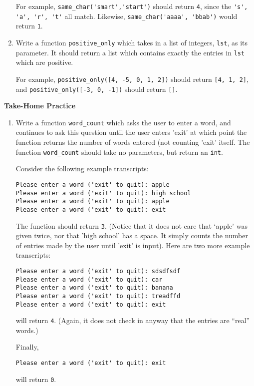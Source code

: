 \documentclass{article}
\begin{document}
\begin{enumerate}
    For example, \verb|same_char('smart','start')| should return \verb|4|, since the \verb|'s', 'a', 'r', 't'| all match. Likewise, \verb|same_char('aaaa', 'bbab')| would return \verb|1|.

\item Write a function \verb|positive_only| which takes in a list of integers, \verb|lst|, as its parameter. It should return a list which contains exactly the entries in \verb|lst| which are positive.

    For example, \verb|positive_only([4, -5, 0, 1, 2])| should return \verb|[4, 1, 2]|, and \verb|positive_only([-3, 0, -1])| should return \verb|[]|.
\end{enumerate}
\newpage
\textbf{Take-Home Practice}

\begin{enumerate}

\item  Write a function \verb|word_count| which asks the user to enter a word, and continues to ask this question until the user enters 'exit' at which point the function returns the number of words entered (not counting 'exit' itself. The function \verb|word_count| should take no parameters, but return an \verb|int|.

    Consider the following example transcripts:

\begin{verbatim}
Please enter a word ('exit' to quit): apple
Please enter a word ('exit' to quit): high school
Please enter a word ('exit' to quit): apple
Please enter a word ('exit' to quit): exit
\end{verbatim}
The function should return \verb|3|. (Notice that it does not care that `apple' was given twice, nor that 'high school' has a space. It simply counts the number of entries made by the user until 'exit' is input).  Here are two more example transcripts:

\begin{verbatim}
Please enter a word ('exit' to quit): sdsdfsdf
Please enter a word ('exit' to quit): car
Please enter a word ('exit' to quit): banana
Please enter a word ('exit' to quit): treadffd
Please enter a word ('exit' to quit): exit
\end{verbatim}
will return \verb|4|. (Again, it does not check in anyway that the entries are ``real'' words.)

Finally,

\begin{verbatim}
Please enter a word ('exit' to quit): exit
\end{verbatim}
will return \verb|0|.


\end{enumerate}
\end{document}
